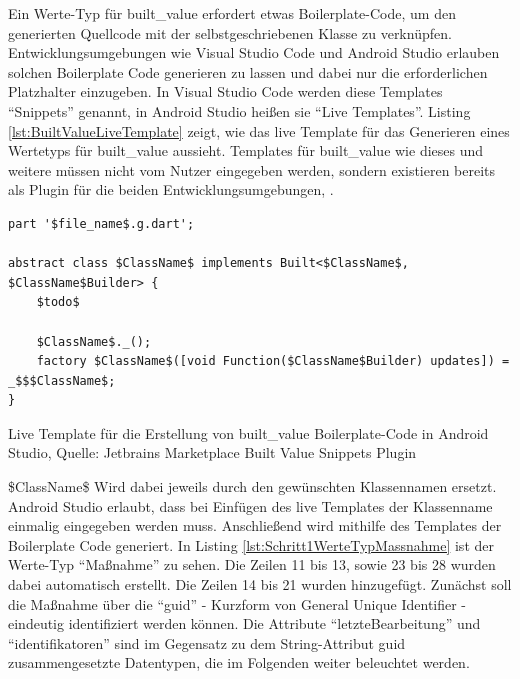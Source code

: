 Ein Werte-Typ für built_value erfordert etwas Boilerplate-Code,  um den generierten Quellcode mit der selbstgeschriebenen Klasse zu verknüpfen.  
Entwicklungsumgebungen wie Visual Studio Code und Android Studio erlauben solchen Boilerplate Code generieren zu lassen und dabei nur die erforderlichen Platzhalter einzugeben.
In Visual Studio Code werden diese Templates \enquote{Snippets} genannt, in Android Studio heißen sie \enquote{Live Templates}.  Listing \ref{lst:BuiltValueLiveTemplate} zeigt, wie das live Template für das Generieren eines Wertetyps  für built_value aussieht. Templates für built_value wie dieses und weitere müssen nicht vom Nutzer eingegeben werden, sondern existieren bereits als Plugin für die beiden Entwicklungsumgebungen, .



\begin{listing}[h]
  \begin{verbatim}
part '$file_name$.g.dart';

abstract class $ClassName$ implements Built<$ClassName$, $ClassName$Builder> {
    $todo$
    
    $ClassName$._();
    factory $ClassName$([void Function($ClassName$Builder) updates]) = _$$$ClassName$;
}
\end{verbatim}
  \caption[built_value Live Template]{Live Template für die Erstellung von built_value Boilerplate-Code in Android Studio, Quelle: Jetbrains Marketplace Built Value Snippets Plugin}
  \label{lst:BuiltValueLiveTemplate}
\end{listing}






\$ClassName\$ Wird dabei jeweils durch den gewünschten Klassennamen ersetzt. Android Studio erlaubt, dass bei Einfügen des live Templates der Klassenname einmalig eingegeben werden muss.  Anschließend wird mithilfe des Templates der Boilerplate Code generiert. In Listing \ref{lst:Schritt1WerteTypMassnahme} ist der Werte-Typ \enquote{Maßnahme} zu sehen. Die Zeilen 11 bis 13, sowie 23 bis 28 wurden dabei automatisch erstellt. Die Zeilen 14 bis 21 wurden hinzugefügt. Zunächst soll die Maßnahme über die \enquote{guid} - Kurzform von General Unique Identifier - eindeutig identifiziert werden können.
Die Attribute \enquote{letzteBearbeitung} und \enquote{identifikatoren} sind im Gegensatz zu dem String-Attribut guid zusammengesetzte Datentypen, die im Folgenden weiter beleuchtet werden.

